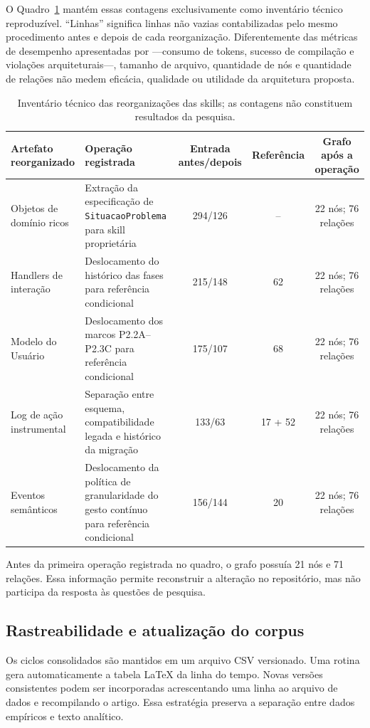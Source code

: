 \documentclass[preprint,12pt,authoryear]{elsarticle}
\begin{document}
O Quadro~\ref{tab:inventario-componentizacao} mantém essas contagens exclusivamente como inventário técnico reproduzível. ``Linhas'' significa linhas não vazias contabilizadas pelo mesmo procedimento antes e depois de cada reorganização. Diferentemente das métricas de desempenho apresentadas por \citet{zare2026microskill}---consumo de tokens, sucesso de compilação e violações arquiteturais---, tamanho de arquivo, quantidade de nós e quantidade de relações não medem eficácia, qualidade ou utilidade da arquitetura proposta.

\begin{table}[htbp]
\centering
\caption{Inventário técnico das reorganizações das skills; as contagens não constituem resultados da pesquisa.}
\label{tab:inventario-componentizacao}
\begin{tabularx}{\textwidth}{@{}p{3.2cm}Xccc@{}}
\toprule
Artefato reorganizado & Operação registrada & Entrada antes/depois & Referência & Grafo após a operação \\
\midrule
Objetos de domínio ricos & Extração da especificação de \texttt{SituacaoProblema} para skill proprietária & 294/126 & -- & 22 nós; 76 relações \\
Handlers de interação & Deslocamento do histórico das fases para referência condicional & 215/148 & 62 & 22 nós; 76 relações \\
Modelo do Usuário & Deslocamento dos marcos P2.2A--P2.3C para referência condicional & 175/107 & 68 & 22 nós; 76 relações \\
Log de ação instrumental & Separação entre esquema, compatibilidade legada e histórico da migração & 133/63 & 17 + 52 & 22 nós; 76 relações \\
Eventos semânticos & Deslocamento da política de granularidade do gesto contínuo para referência condicional & 156/144 & 20 & 22 nós; 76 relações \\
\bottomrule
\end{tabularx}
\end{table}

Antes da primeira operação registrada no quadro, o grafo possuía 21 nós e 71 relações. Essa informação permite reconstruir a alteração no repositório, mas não participa da resposta às questões de pesquisa.

\subsection{Rastreabilidade e atualização do corpus}
Os ciclos consolidados são mantidos em um arquivo CSV versionado. Uma rotina gera automaticamente a tabela LaTeX da linha do tempo. Novas versões consistentes podem ser incorporadas acrescentando uma linha ao arquivo de dados e recompilando o artigo. Essa estratégia preserva a separação entre dados empíricos e texto analítico.
\end{document}

